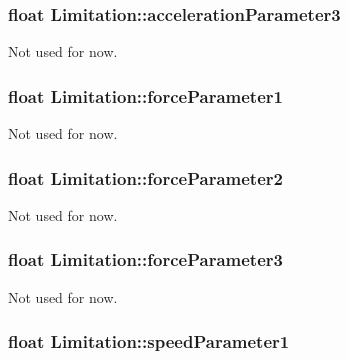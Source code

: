\subsubsection[{\texorpdfstring{acceleration\+Parameter3}{accelerationParameter3}}]{\setlength{\rightskip}{0pt plus 5cm}float Limitation\+::acceleration\+Parameter3}\hypertarget{struct_limitation_a23cd4303674bd42a0e583fced50a3511}{}\label{struct_limitation_a23cd4303674bd42a0e583fced50a3511}
Not used for now. 
\subsubsection[{\texorpdfstring{force\+Parameter1}{forceParameter1}}]{\setlength{\rightskip}{0pt plus 5cm}float Limitation\+::force\+Parameter1}\hypertarget{struct_limitation_abafcff837c521cea6d410245547b148e}{}\label{struct_limitation_abafcff837c521cea6d410245547b148e}
Not used for now. 
\subsubsection[{\texorpdfstring{force\+Parameter2}{forceParameter2}}]{\setlength{\rightskip}{0pt plus 5cm}float Limitation\+::force\+Parameter2}\hypertarget{struct_limitation_a4a48f99b82a0078cfedb029c92355bef}{}\label{struct_limitation_a4a48f99b82a0078cfedb029c92355bef}
Not used for now. 
\subsubsection[{\texorpdfstring{force\+Parameter3}{forceParameter3}}]{\setlength{\rightskip}{0pt plus 5cm}float Limitation\+::force\+Parameter3}\hypertarget{struct_limitation_a25a3f8ac4759c63b46d2201b651817e5}{}\label{struct_limitation_a25a3f8ac4759c63b46d2201b651817e5}
Not used for now. 
\subsubsection[{\texorpdfstring{speed\+Parameter1}{speedParameter1}}]{\setlength{\rightskip}{0pt plus 5cm}float Limitation\+::speed\+Parameter1}\hypertarget{struct_limitation_a3d36f2f90548acecb3e080d8c47d00f2}{}\label{struct_limitation_a3d36f2f90548acecb3e080d8c47d00f2}



